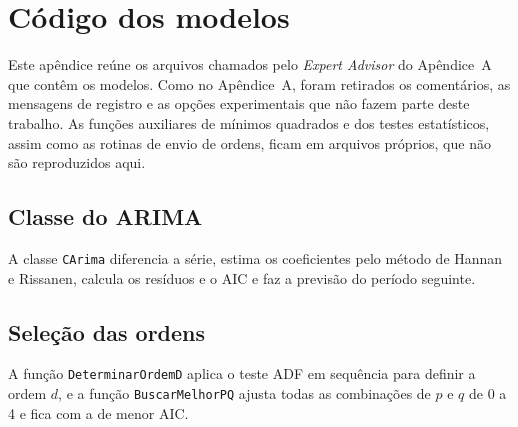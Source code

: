 \chapter{Código dos modelos}

Este apêndice reúne os arquivos chamados pelo \textit{Expert Advisor} do
Apêndice~A que contêm os modelos. Como no Apêndice~A, foram retirados os
comentários, as mensagens de registro e as opções experimentais que não fazem
parte deste trabalho. As funções auxiliares de mínimos quadrados e dos testes
estatísticos, assim como as rotinas de envio de ordens, ficam em arquivos
próprios, que não são reproduzidos aqui.

\section{Classe do ARIMA}

A classe \texttt{CArima} diferencia a série, estima os coeficientes pelo método
de Hannan e Rissanen, calcula os resíduos e o AIC e faz a previsão do período
seguinte.



\section{Seleção das ordens}

A função \texttt{DeterminarOrdemD} aplica o teste ADF em sequência para definir
a ordem $d$, e a função \texttt{BuscarMelhorPQ} ajusta todas as combinações de
$p$ e $q$ de 0 a 4 e fica com a de menor AIC.

